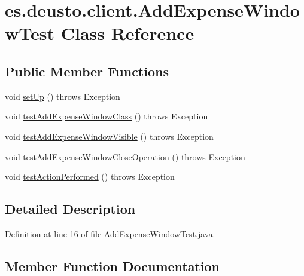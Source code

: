 \hypertarget{classes_1_1deusto_1_1client_1_1_add_expense_window_test}{}\section{es.\+deusto.\+client.\+Add\+Expense\+Window\+Test Class Reference}
\label{classes_1_1deusto_1_1client_1_1_add_expense_window_test}
\subsection*{Public Member Functions}
\begin{DoxyCompactItemize}
\item 
void \hyperlink{classes_1_1deusto_1_1client_1_1_add_expense_window_test_aad34e627ec45525d6a2c3cd84a5b7e53}{set\+Up} ()  throws Exception 
\item 
void \hyperlink{classes_1_1deusto_1_1client_1_1_add_expense_window_test_ab9978ae6c91bff59cd0248dcf64162b0}{test\+Add\+Expense\+Window\+Class} ()  throws Exception 
\item 
void \hyperlink{classes_1_1deusto_1_1client_1_1_add_expense_window_test_abde6a6bf7c49590ba9bcf9e466193ff0}{test\+Add\+Expense\+Window\+Visible} ()  throws Exception 
\item 
void \hyperlink{classes_1_1deusto_1_1client_1_1_add_expense_window_test_abf270b5711e0c1fd74e7818e96487c46}{test\+Add\+Expense\+Window\+Close\+Operation} ()  throws Exception 
\item 
void \hyperlink{classes_1_1deusto_1_1client_1_1_add_expense_window_test_a3a02dbc583b61bd26234be6f840dceee}{test\+Action\+Performed} ()  throws Exception 
\end{DoxyCompactItemize}


\subsection{Detailed Description}


Definition at line 16 of file Add\+Expense\+Window\+Test.\+java.



\subsection{Member Function Documentation}
\mbox{\label{classes_1_1deusto_1_1client_1_1_add_expense_window_test_aad34e627ec45525d6a2c3cd84a5b7e53}} 
